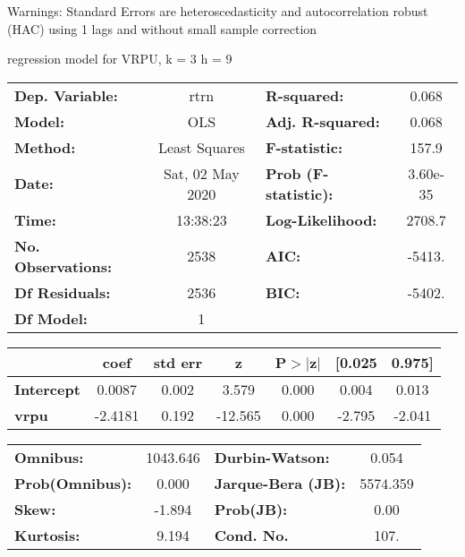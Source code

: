 Warnings: \newline
 [1] Standard Errors are heteroscedasticity and autocorrelation robust (HAC) using 1 lags and without small sample correction\ 

regression model for VRPU, k = 3 h = 9\begin{center}
\begin{tabular}{lclc}
\toprule
\textbf{Dep. Variable:}    &       rtrn       & \textbf{  R-squared:         } &     0.068   \\
\textbf{Model:}            &       OLS        & \textbf{  Adj. R-squared:    } &     0.068   \\
\textbf{Method:}           &  Least Squares   & \textbf{  F-statistic:       } &     157.9   \\
\textbf{Date:}             & Sat, 02 May 2020 & \textbf{  Prob (F-statistic):} &  3.60e-35   \\
\textbf{Time:}             &     13:38:23     & \textbf{  Log-Likelihood:    } &    2708.7   \\
\textbf{No. Observations:} &        2538      & \textbf{  AIC:               } &    -5413.   \\
\textbf{Df Residuals:}     &        2536      & \textbf{  BIC:               } &    -5402.   \\
\textbf{Df Model:}         &           1      & \textbf{                     } &             \\
\bottomrule
\end{tabular}
\begin{tabular}{lcccccc}
                   & \textbf{coef} & \textbf{std err} & \textbf{z} & \textbf{P$> |$z$|$} & \textbf{[0.025} & \textbf{0.975]}  \\
\midrule
\textbf{Intercept} &       0.0087  &        0.002     &     3.579  &         0.000        &        0.004    &        0.013     \\
\textbf{vrpu}      &      -2.4181  &        0.192     &   -12.565  &         0.000        &       -2.795    &       -2.041     \\
\bottomrule
\end{tabular}
\begin{tabular}{lclc}
\textbf{Omnibus:}       & 1043.646 & \textbf{  Durbin-Watson:     } &    0.054  \\
\textbf{Prob(Omnibus):} &   0.000  & \textbf{  Jarque-Bera (JB):  } & 5574.359  \\
\textbf{Skew:}          &  -1.894  & \textbf{  Prob(JB):          } &     0.00  \\
\textbf{Kurtosis:}      &   9.194  & \textbf{  Cond. No.          } &     107.  \\
\bottomrule
\end{tabular}
\end{center}

